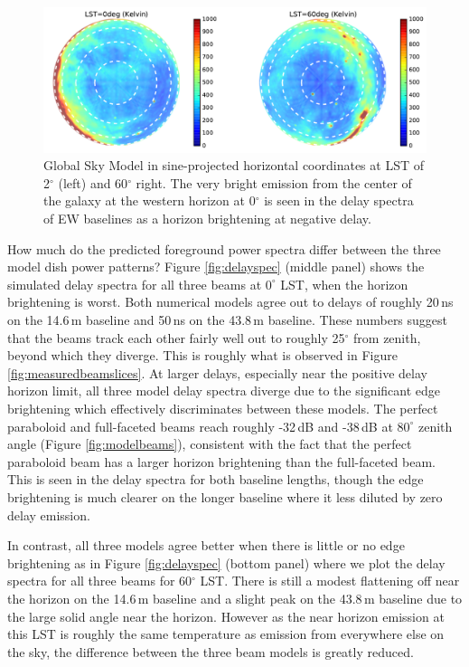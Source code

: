 \documentclass{emulateapj}
\begin{document}
\begin{figure}[t]
\centering
\includegraphics[width=6in]{gsm_kelvin_LST_2deg_and_62deg.pdf}
\caption{Global Sky Model \citep{gsm} in sine-projected horizontal coordinates at LST of 2$^\circ$ (left) and 60$^\circ$ right. The very bright emission from the center of the galaxy at the western horizon at 0$^\circ$ is seen in the delay spectra of EW baselines as a horizon brightening at negative delay.}
\label{fig:gsmplots}
\end{figure}

How much do the predicted foreground power spectra differ between the three model dish power patterns? Figure \ref{fig:delayspec} (middle panel) shows the simulated delay spectra for all three beams at $0^\circ$ LST, when the horizon brightening is worst. Both numerical models agree out to delays of roughly 20\,ns on the 14.6\,m baseline and 50\,ns on the 43.8\,m baseline. These numbers suggest that the beams track each other fairly well out to roughly 25$^\circ$ from zenith, beyond which they diverge. This is roughly what is observed in Figure \ref{fig:measuredbeamslices}. At larger delays, especially near the positive delay horizon limit, all three model delay spectra diverge due to the significant edge brightening which effectively discriminates between these models. The perfect paraboloid and full-faceted beams reach roughly -32\,dB and -38\,dB at $80^\circ$ zenith angle (Figure \ref{fig:modelbeams}), consistent with the fact that the perfect paraboloid beam has a larger horizon brightening than the full-faceted beam. This is seen in the delay spectra for both baseline lengths, though the edge brightening is much clearer on the longer baseline where it less diluted by zero delay emission.  

In contrast, all three models agree better when there is little or no edge brightening as in Figure \ref{fig:delayspec} (bottom panel) where we plot the delay spectra for all three beams for 60$^\circ$ LST. There is still a modest flattening off near the horizon on the 14.6\,m baseline and a slight peak on the 43.8\,m baseline due to the large solid angle near the horizon. However as the near horizon emission at this LST is roughly the same temperature as emission from everywhere else on the sky, the difference between the three beam models is greatly reduced.
\end{document}
